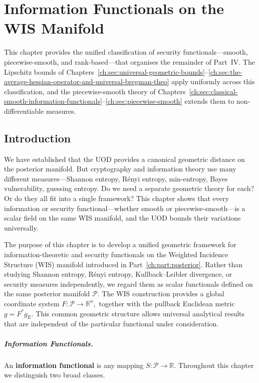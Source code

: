 \chapter[Information Functionals]{Information Functionals on the WIS Manifold}\label{ch:sec:information-functionals-on-the-wis-manifold}

This chapter provides the unified classification of security functionals---smooth, piecewise-smooth, and rank-based---that organises the remainder of Part~IV. The Lipschitz bounds of Chapters~\ref{ch:sec:universal-geometric-bounds}--\ref{ch:sec:the-average-hessian-operator-and-universal-bregman-theo} apply uniformly across this classification, and the piecewise-smooth theory of Chapters~\ref{ch:sec:classical-smooth-information-functionals}--\ref{ch:sec:piecewise-smooth} extends them to non-differentiable measures.


\section{Introduction}\label{ch:sec:introduction-functionals}
We have established that the UOD provides a canonical geometric distance
on the posterior manifold.  But cryptography and information theory use
many different measures---Shannon entropy, R\'enyi entropy, min-entropy,
Bayes vulnerability, guessing entropy.  Do we need a separate geometric
theory for each?  Or do they all fit into a single framework?  This
chapter shows that every information or security functional---whether
smooth or piecewise-smooth---is a scalar field on the same WIS manifold,
and the UOD bounds their variations universally.

The purpose of this chapter is to develop a unified geometric framework
for information-theoretic and security functionals on the Weighted
Incidence Structure (WIS) manifold introduced in Part~\ref{ch:part:posterior}.
Rather than studying Shannon entropy, R\'enyi entropy, Kullback--Leibler
divergence, or security measures independently, we regard them as scalar
functionals defined on the same posterior manifold
$\mathcal P.$
The WIS construction provides a global coordinate system
$F:\mathcal P\rightarrow\mathbb R^n,$
together with the pullback Euclidean metric
$g=F^*g_E.$
This common geometric structure allows universal analytical results that
are independent of the particular functional under consideration.
\paragraph{Information Functionals.}
An \textbf{information functional} is any mapping
$S:\mathcal P\rightarrow\mathbb R.$
Throughout this chapter we distinguish two broad classes.

